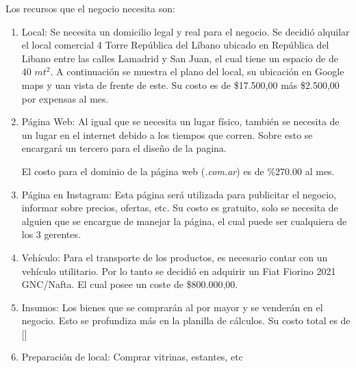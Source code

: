 \documentclass[11pt,a4paper]{article}
\begin{document}
Los recursos que el negocio necesita son:
\begin{enumerate}
    \item Local: Se necesita un domicilio legal y real para el negocio. Se decidió alquilar el local comercial 4 Torre República del Líbano ubicado en República del Libano entre las calles Lamadrid y San Juan, el cual tiene un espacio de de 40 $mt^2$. A continuación se muestra el plano del local, su ubicación en Google maps y uan vista de frente de este.
	Su costo es de \$17.500,00 más \$2.500,00 por expensas al mes.
    \item Página Web: Al igual que se necesita un lugar físico, también se necesita de un lugar en el internet debido a los tiempos que corren. Sobre esto se encargará un tercero para el diseño de la pagina.
    
        El costo para el dominio de la página web (\textit{.com.ar}) es de \%270.00 al mes.
    \item Página en Instagram: Esta página será utilizada para publicitar el negocio, informar sobre precios, ofertas, etc. Su costo es gratuito, solo se necesita de alguien que se encargue de manejar la página, el cual puede ser cualquiera de los 3 gerentes.
    \item Vehículo: Para el transporte de los productos, es necesario contar con un vehículo utilitario. Por lo tanto se decidió en adquirir un Fiat Fiorino 2021 GNC/Nafta.
    El cual posee un coste de \$800.000,00.
    \item Insumos: Los bienes que se comprarán al por mayor y se venderán en el negocio. Esto se profundiza más en la planilla de cálculos. Su costo total es de []
    \item Preparación de local: Comprar vitrinas, estantes, etc 
\end{enumerate}
\end{document}
